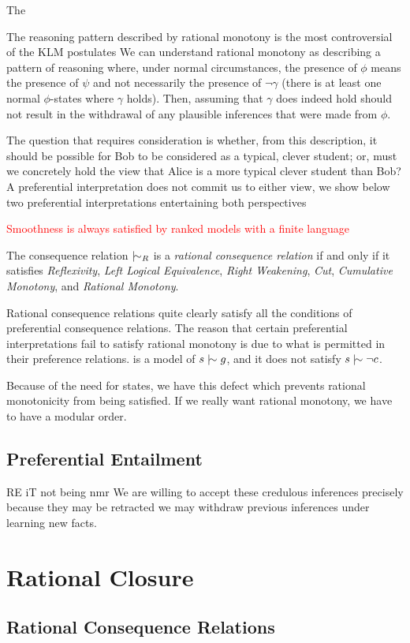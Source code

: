 The

\clearpage
The reasoning pattern described by rational monotony is the most controversial of the KLM postulates We can understand rational
monotony as describing a pattern of reasoning where, under normal circumstances, the presence of $\phi$ means the presence
of $\psi$ and not necessarily the presence of $\neg \gamma$ (there is at least one normal $\phi$-states where $\gamma$
holds). Then, assuming that $\gamma$ does indeed hold should not result in the withdrawal of any plausible inferences that
were made from $\phi$.

The question that requires consideration is whether, from this description, it should be possible for Bob to be considered
as a typical, clever student; or, must we concretely hold the view that Alice is a more typical clever student than Bob?
A preferential interpretation does not commit us to either view, we show below two preferential interpretations
entertaining both perspectives

\textcolor{red}{Smoothness is always satisfied by ranked models with a finite language}

\begin{definition}
	\label{definition:rational-consequence-relation} 

	The consequence relation $\twiddle_{R}$ is a \emph{rational consequence relation} if and only if it satisfies \textit{Reflexivity},
	\textit{Left Logical Equivalence}, \textit{Right Weakening}, \textit{Cut}, \textit{Cumulative Monotony}, and \textit{Rational
	Monotony}.
\end{definition}

Rational consequence relations quite clearly satisfy all the conditions of preferential consequence relations. The reason
that certain preferential interpretations fail to satisfy rational monotony is due to what is permitted in their preference
relations.  is a model of $s \twiddle g$, and it does not satisfy $s \twiddle \neg c$.

Because of the need for states, we have this defect which prevents rational monotonicity from being satisfied. If we really
want rational monotony, we have to have a modular order.

\subsection{Preferential Entailment}

RE iT not being nmr We are willing to accept these credulous inferences precisely because they may be retracted we may withdraw
previous inferences under learning new facts.

\section{Rational Closure}

\subsection{Rational Consequence Relations}